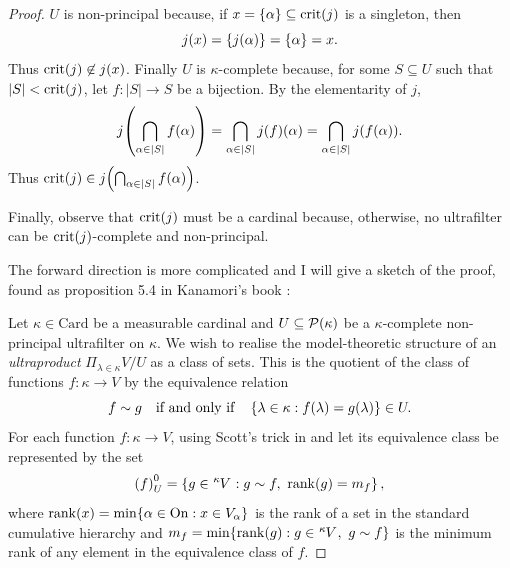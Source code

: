 \documentclass[12pt]{article}
\theoremstyle{plain}
\theoremstyle{definition}
\newcommand{\On}{\mathrm{On}}
\newcommand{\Card}{\mathrm{Card}}
\DeclareMathOperator{\rank}{rank}
\DeclareMathOperator{\crit}{crit}
\begin{document}
\begin{proof}
	$U$ is non-principal because, if $x = \left\{\alpha\right\} \subseteq \crit\mleft(j\mright)$ is a singleton, then
	\[j\mleft(x\mright) = \left\{j\mleft(\alpha\mright)\right\} = \left\{\alpha\right\} = x.\]
	Thus $\crit\mleft(j\mright) \not\in j\mleft(x\mright)$. Finally $U$ is $\kappa$-complete because, for some $S \subseteq U$ such that $\left|S\right| < \crit\mleft(j\mright)$, let $f : \left|S\right| \rightarrow S$ be a bijection. By the elementarity of $j$,
	\[j\mleft(\bigcap_{\alpha \in \left|S\right|} f\mleft(\alpha\mright)\mright) = \bigcap_{\alpha \in \left|S\right|} j\mleft(f\mright)\mleft(\alpha\mright) = \bigcap_{\alpha \in \left|S\right|} j\mleft(f\mleft(\alpha\mright)\mright).\]
	Thus $\crit\mleft(j\mright) \in j\mleft(\bigcap_{\alpha \in \left|S\right|} f\mleft(\alpha\mright)\mright)$.

	Finally, observe that $\crit\mleft(j\mright)$ must be a cardinal because, otherwise, no ultrafilter can be $\crit\mleft(j\mright)$-complete and non-principal.

	The forward direction is more complicated and I will give a sketch of the proof, found as proposition 5.4 in Kanamori's book \cite{higher-infinite}:

	Let $\kappa \in \Card$ be a measurable cardinal and $U \subseteq \mathcal{P}\mleft(\kappa\mright)$ be a $\kappa$-complete non-principal ultrafilter on $\kappa$. We wish to realise the model-theoretic structure of an \emph{ultraproduct} $\Pi_{\lambda \in \kappa} V / U$ as a class of sets. This is the quotient of the class of functions $f : \kappa \rightarrow V$ by the equivalence relation
	\[f \sim g \quad \text{if and only if} \quad \left\{\lambda \in \kappa : f\mleft(\lambda\mright) = g\mleft(\lambda\mright)\right\} \in U.\]
	For each function $f : \kappa \rightarrow V$, using Scott's trick in \cite{scotts-trick} and let its equivalence class be represented by the set
	\[\left(f\right)^0_U = \left\{g \in \tensor[^\kappa]{V}{} : g \sim f, \ \rank\mleft(g\mright) = m_f\right\},\]
	where $\rank\mleft(x\mright) = \min\mleft\{\alpha \in \On : x \in V_\alpha\mright\}$ is the rank of a set in the standard cumulative hierarchy and $m_f = \min\mleft\{\rank\mleft(g\mright) : g \in \tensor[^\kappa]{V}{}, \ g \sim f\mright\}$ is the minimum rank of any element in the equivalence class of $f$.


\end{proof}
\end{document}
